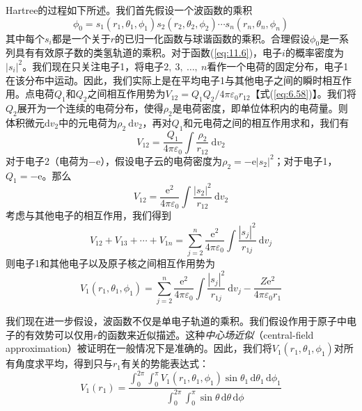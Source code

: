     Hartree的过程如下所述。我们首先假设一个波函数的乘积
    \begin{equation}
        \phi_0 = s_1(r_1, \theta_1, \phi_1) s_2(r_2, \theta_2, \phi_2) \cdots s_n(r_n, \theta_n, \phi_n)
        \label{eq:11.6}
    \end{equation}
    其中每个$s_i$都是一个关于$r$的已归一化函数与球谐函数的乘积。合理假设$\phi_0$是一系列具有有效原子数的类氢轨道的乘积。对于函数(\ref{eq:11.6})，电子$i$的概率密度为$\left|s_i\right|^2$。我们现在只关注电子1，将电子$2,\:3,\:\ldots,\:n$看作一个电荷的固定分布，电子1在该分布中运动。因此，我们实际上是在平均电子1与其他电子之间的瞬时相互作用。点电荷$Q_1$和$Q_2$之间相互作用势为$V_{12} = Q_1 Q_2 / 4\pi\varepsilon_0 r_{12}$【式(\ref{eq:6.58})】。我们将$Q_2$展开为一个连续的电荷分布，使得$\rho_2$是电荷密度，即单位体积内的电荷量。则体积微元$\mathrm{d} v_2$中的元电荷为$\rho_2 \:\mathrm{d} v_2$，再对$Q_1$和元电荷之间的相互作用求和，我们有
    \begin{equation*}
        V_{12} = \frac{Q_1}{4\pi\varepsilon_0} \int \frac{\rho_2}{r_{12}} \:\mathrm{d} v_2
    \end{equation*}
    对于电子2（电荷为$-\mathrm{e}$），假设电子云的电荷密度为$\rho_2 = -\mathrm{e}\left|s_2\right|^2$；对于电子1，$Q_1 = -\mathrm{e}$。那么
    \begin{equation*}
        V_{12} = \frac{\mathrm{e}^2}{4\pi\varepsilon_0} \int \frac{\left|s_2\right|^2}{r_{12}} \:\mathrm{d} v_2
    \end{equation*}
    考虑与其他电子的相互作用，我们得到
    \begin{equation*}
        V_{12} + V_{13} + \cdots + V_{1n} = \sum_{j=2}^{n} \frac{\mathrm{e}^2}{4\pi\varepsilon_0} \int \frac{\left|s_j\right|^2}{r_{1j}} \:\mathrm{d} v_j
    \end{equation*}
    则电子1和其他电子以及原子核之间相互作用势为
    \begin{equation}
        V_1(r_1, \theta_1, \phi_1) = \sum_{j=2}^{n} \frac{\mathrm{e}^2}{4\pi\varepsilon_0} \int \frac{|s_j|^2}{r_{1j}} \:\mathrm{d} v_j - \frac{Z\mathrm{e}^2}{4\pi\varepsilon_0 r_1}
        \label{eq:11.7}
    \end{equation}

    我们现在进一步假设，波函数不仅是单电子轨道的乘积。我们假设作用于原子中电子的有效势可以仅用$r$的函数来近似描述。这种\textit{中心场近似}（central-field approximation）被证明在一般情况下是准确的。因此，我们将$V_1(r_1, \theta_1, \phi_1)$对所有角度求平均，得到只与$r_1$有关的势能表达式：
    \begin{equation}
        V_{1}(r_{1}) =
        \dfrac{
            \displaystyle \int_{0}^{2\pi} \int_{0}^{\pi} V_{1}(r_{1}, \theta_{1}, \phi_{1}) \sin \theta_{1} \, \mathrm{d}\theta_{1} \, \mathrm{d}\phi_{1}
        }{
            \displaystyle \int_{0}^{2\pi} \int_{0}^{\pi} \sin \theta \, \mathrm{d}\theta \, \mathrm{d}\phi
        }
        \label{eq:11.8}
    \end{equation}

